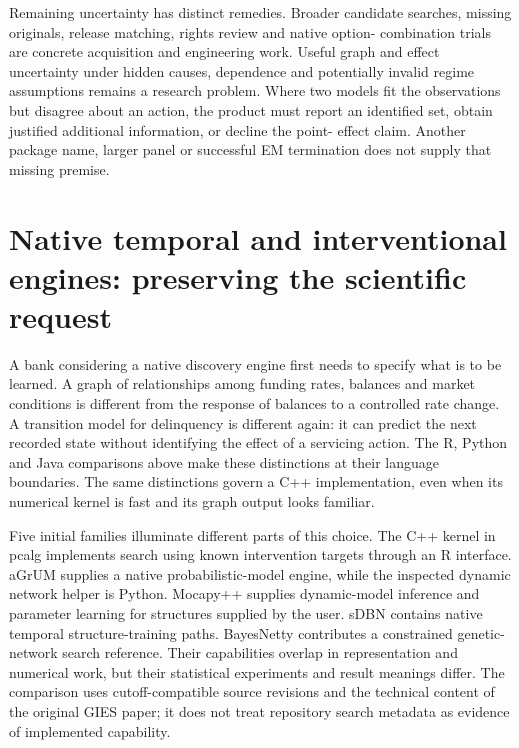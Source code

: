 Remaining uncertainty has distinct remedies. Broader candidate searches,
missing originals, release matching, rights review and native option-
combination trials are concrete acquisition and engineering work. Useful graph
and effect uncertainty under hidden causes, dependence and potentially invalid
regime assumptions remains a research problem. Where two models fit the
observations but disagree about an action, the product must report an
identified set, obtain justified additional information, or decline the point-
effect claim. Another package name, larger panel or successful EM termination
does not supply that missing premise.~\citep{exec15_javatemporal_design}
\label{exec15:java-temporal-end}


\section{Native temporal and interventional engines: preserving the scientific request}
\label{exec16:cxx-temporal}

A bank considering a native discovery engine first needs to specify what is
to be learned. A graph of relationships among funding rates, balances and
market conditions is different from the response of balances to a controlled
rate change. A transition model for delinquency is different again: it can
predict the next recorded state without identifying the effect of a servicing
action. The R, Python and Java comparisons above make these distinctions at
their language boundaries. The same distinctions govern a C++ implementation,
even when its numerical kernel is fast and its graph output looks familiar.

Five initial families illuminate different parts of this choice. The C++ kernel in
pcalg implements search using known intervention targets through an R interface.
aGrUM supplies a native probabilistic-model engine, while the inspected dynamic
network helper is Python. Mocapy++ supplies dynamic-model inference and parameter
learning for structures supplied by the user. sDBN contains native temporal
structure-training paths. BayesNetty contributes a constrained genetic-network
search reference. Their capabilities overlap in representation and numerical
work, but their statistical experiments and result meanings differ.
The comparison uses cutoff-compatible source revisions and the technical
content of the original GIES paper; it does not treat repository search
metadata as evidence of implemented capability. \citep{exec16_ct_pcalg,exec16_ct_agrum,exec16_ct_mocapy,exec16_ct_sdbn,exec16_ct_bayesnetty,exec14_pt_paper_gies}

